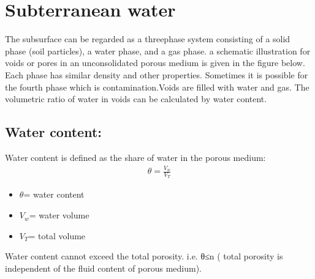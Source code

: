 \documentclass[letterpaper,10pt,english]{sphinxmanual}
\let\sphinxpxdimen\pdfpxdimen\else\newdimen\sphinxpxdimen
\begin{document}
\section{Subterranean water}
\label{\detokenize{contents/flow/12_subsurface_structure:subterranean-water}}
The subsurface can be regarded as a three\sphinxhyphen{}phase system consisting of a solid phase (soil particles), a water phase, and a gas phase. a schematic illustration for voids or pores in an unconsolidated porous medium is given in the figure below. Each phase has similar density and other properties. Sometimes it is possible for the fourth phase which is contamination.Voids are filled with water and gas. The volumetric ratio of water in voids can be calculated by water content.

\noindent{\hspace*{\fill}\sphinxincludegraphics[height=200\sphinxpxdimen]{{L02_fig10}.png}\hspace*{\fill}}


\subsection{Water content:}
\label{\detokenize{contents/flow/12_subsurface_structure:water-content}}
Water content is defined as the share of water in the porous medium:
\begin{equation*}
\begin{split}{\theta}=\frac{V_{w}}{V_{T}}\end{split}
\end{equation*}\begin{itemize}
\item {} 
\({\theta}\)= water content

\item {} 
\({V_{w}}\)= water volume

\item {} 
\({V_{T}}\)= total volume

\end{itemize}

Water content cannot exceed the total porosity. i.e. θ≤n ( total porosity is independent of the fluid content of porous medium).
\end{document}

